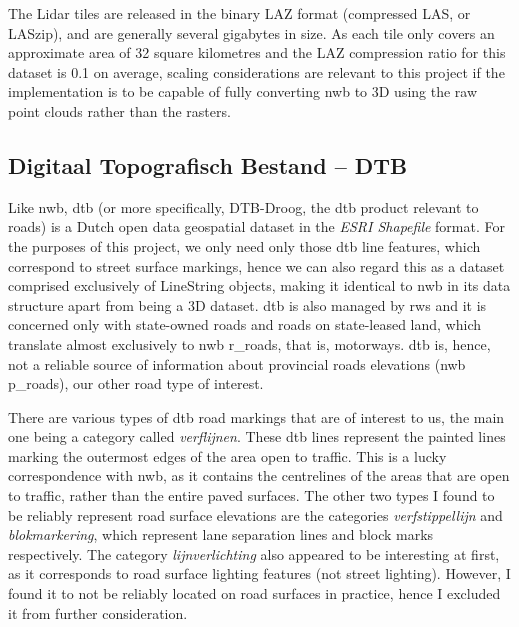 The Lidar tiles are released in the binary LAZ format (compressed LAS, or LASzip), and are generally several gigabytes in size. As each tile only covers an approximate area of 32 square kilometres and the LAZ compression ratio for this dataset is 0.1 on average, scaling considerations are relevant to this project if the implementation is to be capable of fully converting \ac{nwb} to 3D using the raw point clouds rather than the rasters.

\subsection{Digitaal Topografisch Bestand – DTB}
\label{sub:dtb}

Like \ac{nwb}, \ac{dtb} (or more specifically, DTB-Droog, the \ac{dtb} product relevant to roads) is a Dutch open data geospatial dataset in the \textit{ESRI Shapefile} format. For the purposes of this project, we only need only those \ac{dtb} line features, which correspond to street surface markings, hence we can also regard this as a dataset comprised exclusively of LineString objects, making it identical to \ac{nwb} in its data structure apart from being a 3D dataset. \ac{dtb} is also managed by \ac{rws} and it is concerned only with state-owned roads and roads on state-leased land, which translate almost exclusively to \ac{nwb} \ac{r_roads}, that is, motorways. \ac{dtb} is, hence, not a reliable source of information about provincial roads elevations (\ac{nwb} \ac{p_roads}), our other road type of interest.

There are various types of \ac{dtb} road markings that are of interest to us, the main one being a category called \textit{verflijnen}. These \ac{dtb} lines represent the painted lines marking the outermost edges of the area open to traffic. This is a lucky correspondence with \ac{nwb}, as it contains the centrelines of the areas that are open to traffic, rather than the entire paved surfaces. The other two types I found to be reliably represent road surface elevations are the categories \textit{verfstippellijn} and \textit{blokmarkering}, which represent lane separation lines and block marks respectively. The category \textit{lijnverlichting} also appeared to be interesting at first, as it corresponds to road surface lighting features (not street lighting). However, I found it to not be reliably located on road surfaces in practice, hence I excluded it from further consideration.

